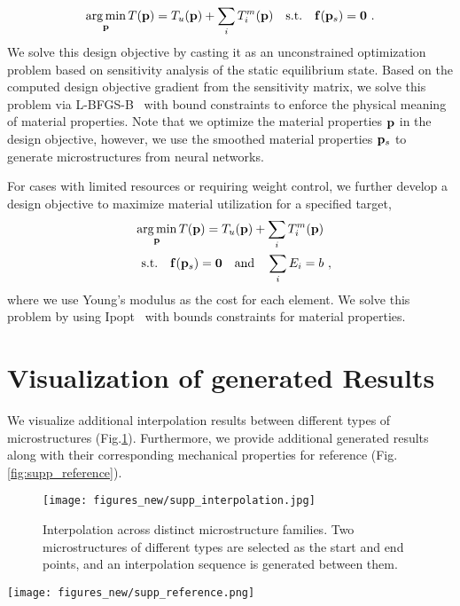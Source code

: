 \begin{equation}
    \operatorname*{arg\,min}_{\mathbf{p}} T(\mathbf{p}) = T_u(\mathbf{p}) + \sum_i T_i^m(\mathbf{p})
    \quad\text{s.t.}\quad \mathbf{f}(\mathbf{p}_s) = \mathbf{0} \ .
    \label{eq:materialOpt}
\end{equation}
We solve this design objective by casting it as an unconstrained optimization problem based on sensitivity analysis of the static equilibrium state. Based on the computed design objective gradient from the sensitivity matrix, we solve this problem via L-BFGS-B~\cite{L-BFGS-B} with bound constraints to enforce the physical meaning of material properties. Note that we optimize the material properties $\mathbf{p}$ in the design objective, however, we use the smoothed material properties $\mathbf{p}_s$ to generate microstructures from neural networks.

For cases with limited resources or requiring weight control, we further develop a design objective to maximize material utilization for a specified target,
\begin{equation}
    \begin{gathered}
    \operatorname*{arg\,min}_{\mathbf{p}} T(\mathbf{p}) = T_u(\mathbf{p}) + \sum_i T_i^m(\mathbf{p})
    \\ \quad\text{s.t.}\quad \mathbf{f}(\mathbf{p}_s) = \mathbf{0}  \quad\text{and}\quad \sum_i E_i = b \ ,
    \label{eq:materialOpt_budget}
    \end{gathered}
\end{equation}
where we use Young's modulus as the cost for each element. We solve this problem by using Ipopt~\cite{Ipopt} with bounds constraints for material properties.


\section{Visualization of generated Results}
\label{sec:more_vis}


We visualize additional interpolation results between different types of microstructures (Fig.\ref{fig:supp_interpolation}). 
Furthermore, we provide additional generated results along with their corresponding mechanical properties for reference (Fig.\ref{fig:supp_reference}).

\begin{figure}
    \centering
    \texttt{[image: figures\_new/supp\_interpolation.jpg]}
    \caption{Interpolation across distinct microstructure families. Two microstructures of different types are selected as the start and end points, and an interpolation sequence is generated between them.}
    \label{fig:supp_interpolation}
\end{figure} 


\begin{figure*}[tb]
    \centering
    \texttt{[image: figures\_new/supp\_reference.png]}
    \caption{More generated results from a reference model.
Using the reference model's mechanical properties as input, five candidate models generated by our framework are shown. The properties values ($E,\nu,G$) for both the reference model and generated models are listed. }
    \label{fig:supp_reference}
\end{figure*} 

